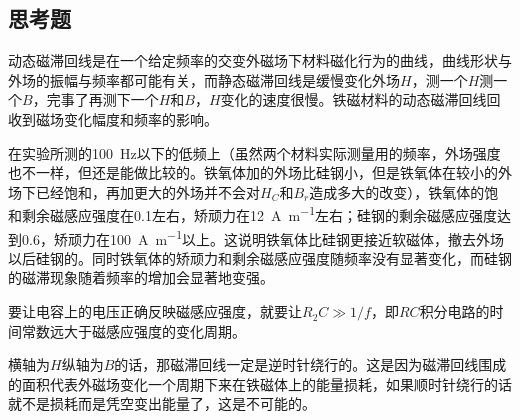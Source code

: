 \documentclass[UTF8]{ctexart}
\begin{document}
\subsection{思考题}
动态磁滞回线是在一个给定频率的交变外磁场下材料磁化行为的曲线，曲线形状与外场的振幅与频率都可能有关，而静态磁滞回线是缓慢变化外场$H$，测一个$H$测一个$B$，完事了再测下一个$H$和$B$，$H$变化的速度很慢。铁磁材料的动态磁滞回线回收到磁场变化幅度和频率的影响。

在实验所测的\SI{100}{\Hz}以下的低频上（虽然两个材料实际测量用的频率，外场强度也不一样，但还是能做比较的。铁氧体加的外场比硅钢小，但是铁氧体在较小的外场下已经饱和，再加更大的外场并不会对$H_C$和$B_r$造成多大的改变），铁氧体的饱和剩余磁感应强度在\SI{0.1}{\T}左右，矫顽力在\SI{12}{A\per\meter}左右；硅钢的剩余磁感应强度达到\SI{.6}{\T}，矫顽力在\SI{100}{\A\per\m}以上。这说明铁氧体比硅钢更接近软磁体，撤去外场以后硅钢的。同时铁氧体的矫顽力和剩余磁感应强度随频率没有显著变化，而硅钢的磁滞现象随着频率的增加会显著地变强。

要让电容上的电压正确反映磁感应强度，就要让$R_2C\gg1/f$，即$RC$积分电路的时间常数远大于磁感应强度的变化周期。

横轴为$H$纵轴为$B$的话，那磁滞回线一定是逆时针绕行的。这是因为磁滞回线围成的面积代表外磁场变化一个周期下来在铁磁体上的能量损耗，如果顺时针绕行的话就不是损耗而是凭空变出能量了，这是不可能的。
\end{document}
